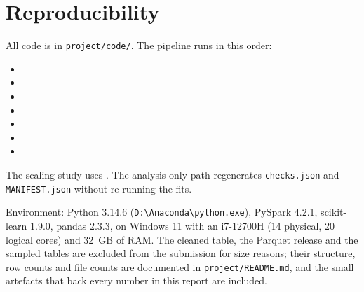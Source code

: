 \documentclass[11pt,a4paper]{article}
\newcommand{\code}[1]{\texttt{\small #1}}
\begin{document}
\section*{Reproducibility}

All code is in \code{project/code/}. The pipeline runs in this order:
\begin{itemize}
\item {}
\item {}
\item {}
\item {}
\item {}
\item {}
\item {}
\end{itemize}
The scaling study uses . The analysis-only path regenerates \code{checks.json} and \code{MANIFEST.json} without re-running the fits.

Environment: Python 3.14.6 (\code{D:\textbackslash Anaconda\textbackslash python.exe}), PySpark 4.2.1, scikit-learn 1.9.0, pandas 2.3.3, on Windows 11 with an i7-12700H (14 physical, 20 logical cores) and 32~GB of RAM. The cleaned table, the Parquet release and the sampled tables are excluded from the submission for size reasons; their structure, row counts and file counts are documented in \code{project/README.md}, and the small artefacts that back every number in this report are included.
\end{document}
